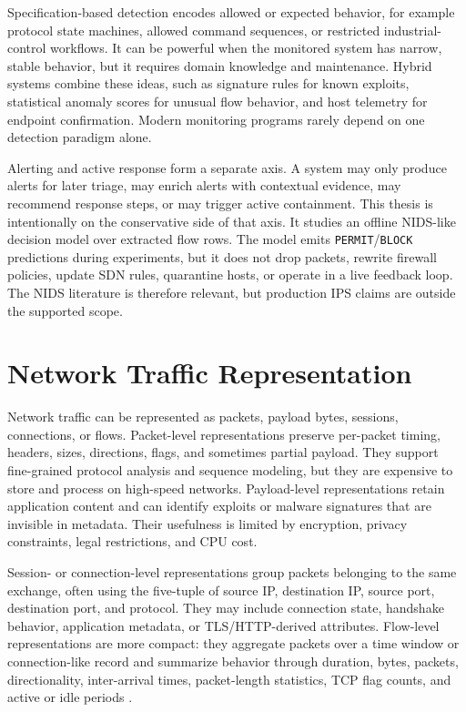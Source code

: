Specification-based detection encodes allowed or expected behavior, for example protocol state machines, allowed command sequences, or restricted industrial-control workflows. It can be powerful when the monitored system has narrow, stable behavior, but it requires domain knowledge and maintenance. Hybrid systems combine these ideas, such as signature rules for known exploits, statistical anomaly scores for unusual flow behavior, and host telemetry for endpoint confirmation. Modern monitoring programs rarely depend on one detection paradigm alone.

Alerting and active response form a separate axis. A system may only produce alerts for later triage, may enrich alerts with contextual evidence, may recommend response steps, or may trigger active containment. This thesis is intentionally on the conservative side of that axis. It studies an offline NIDS-like decision model over extracted flow rows. The model emits \texttt{PERMIT}/\texttt{BLOCK} predictions during experiments, but it does not drop packets, rewrite firewall policies, update SDN rules, quarantine hosts, or operate in a live feedback loop. The NIDS literature is therefore relevant, but production IPS claims are outside the supported scope.

\section{Network Traffic Representation}

Network traffic can be represented as packets, payload bytes, sessions, connections, or flows. Packet-level representations preserve per-packet timing, headers, sizes, directions, flags, and sometimes partial payload. They support fine-grained protocol analysis and sequence modeling, but they are expensive to store and process on high-speed networks. Payload-level representations retain application content and can identify exploits or malware signatures that are invisible in metadata. Their usefulness is limited by encryption, privacy constraints, legal restrictions, and CPU cost.

Session- or connection-level representations group packets belonging to the same exchange, often using the five-tuple of source IP, destination IP, source port, destination port, and protocol. They may include connection state, handshake behavior, application metadata, or TLS/HTTP-derived attributes. Flow-level representations are more compact: they aggregate packets over a time window or connection-like record and summarize behavior through duration, bytes, packets, directionality, inter-arrival times, packet-length statistics, TCP flag counts, and active or idle periods \parencite{Sperotto2010FlowIDS,Umer2017FlowIDS}.


